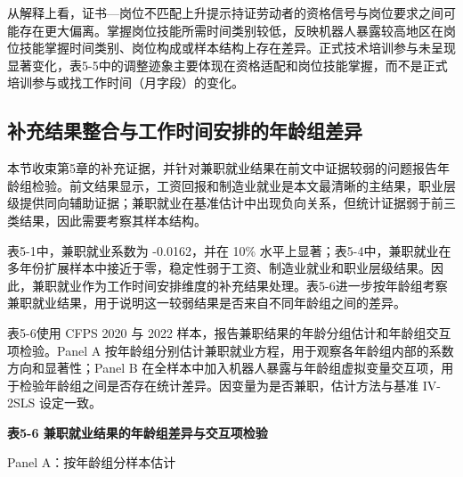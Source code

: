 \documentclass[UTF8, zihao=-4, a4paper, openany, fontset=none]{ctexrep}
\numberwithin{equation}{chapter}
\begin{document}
从解释上看，证书---岗位不匹配上升提示持证劳动者的资格信号与岗位要求之间可能存在更大偏离。掌握岗位技能所需时间类别较低，反映机器人暴露较高地区在岗位技能掌握时间类别、岗位构成或样本结构上存在差异。正式技术培训参与未呈现显著变化，表5-5中的调整迹象主要体现在资格适配和岗位技能掌握，而不是正式培训参与或找工作时间（月字段）的变化。

\subsection{补充结果整合与工作时间安排的年龄组差异}\label{ux8865ux5145ux7ed3ux679cux6574ux5408ux4e0eux5de5ux4f5cux65f6ux95f4ux5b89ux6392ux7684ux5e74ux9f84ux7ec4ux5deeux5f02}

本节收束第5章的补充证据，并针对兼职就业结果在前文中证据较弱的问题报告年龄组检验。前文结果显示，工资回报和制造业就业是本文最清晰的主结果，职业层级提供同向辅助证据；兼职就业在基准估计中出现负向关系，但统计证据弱于前三类结果，因此需要考察其样本结构。

表5-1中，兼职就业系数为 -0.0162，并在 10\% 水平上显著；表5-4中，兼职就业在多年份扩展样本中接近于零，稳定性弱于工资、制造业就业和职业层级结果。因此，兼职就业作为工作时间安排维度的补充结果处理。表5-6进一步按年龄组考察兼职就业结果，用于说明这一较弱结果是否来自不同年龄组之间的差异。

表5-6使用 CFPS 2020 与 2022 样本，报告兼职结果的年龄分组估计和年龄组交互项检验。Panel A 按年龄组分别估计兼职就业方程，用于观察各年龄组内部的系数方向和显著性；Panel B 在全样本中加入机器人暴露与年龄组虚拟变量交互项，用于检验年龄组之间是否存在统计差异。因变量为是否兼职，估计方法与基准 IV-2SLS 设定一致。

\textbf{表5-6 兼职就业结果的年龄组差异与交互项检验}

Panel A：按年龄组分样本估计
\end{document}
